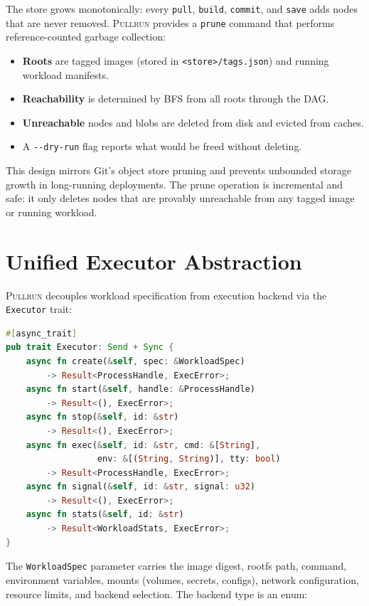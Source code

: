 \documentclass[11pt,a4paper]{article}
\newcommand{\pullrun}{\textsc{Pullrun}}
\begin{document}
The store grows monotonically: every \texttt{pull}, \texttt{build}, \texttt{commit}, and \texttt{save} adds nodes that are never removed. \pullrun{} provides a \texttt{prune} command that performs reference-counted garbage collection:

\begin{itemize}[leftmargin=*]
    \item \textbf{Roots} are tagged images (stored in \texttt{<store>/tags.json}) and running workload manifests.
    \item \textbf{Reachability} is determined by BFS from all roots through the DAG.
    \item \textbf{Unreachable} nodes and blobs are deleted from disk and evicted from caches.
    \item A \texttt{-{}-dry-run} flag reports what would be freed without deleting.
\end{itemize}

This design mirrors Git's object store pruning and prevents unbounded storage growth in long-running deployments. The prune operation is incremental and safe: it only deletes nodes that are provably unreachable from any tagged image or running workload.

\section{Unified Executor Abstraction}\label{sec:executor}

\pullrun{} decouples workload specification from execution backend via the \texttt{Executor} trait:

\begin{lstlisting}[language=Rust]
#[async_trait]
pub trait Executor: Send + Sync {
    async fn create(&self, spec: &WorkloadSpec) 
        -> Result<ProcessHandle, ExecError>;
    async fn start(&self, handle: &ProcessHandle) 
        -> Result<(), ExecError>;
    async fn stop(&self, id: &str) 
        -> Result<(), ExecError>;
    async fn exec(&self, id: &str, cmd: &[String], 
                  env: &[(String, String)], tty: bool) 
        -> Result<ProcessHandle, ExecError>;
    async fn signal(&self, id: &str, signal: u32) 
        -> Result<(), ExecError>;
    async fn stats(&self, id: &str) 
        -> Result<WorkloadStats, ExecError>;
}
\end{lstlisting}

The \texttt{WorkloadSpec} parameter carries the image digest, rootfs path, command, environment variables, mounts (volumes, secrets, configs), network configuration, resource limits, and backend selection. The backend type is an enum:
\end{document}
